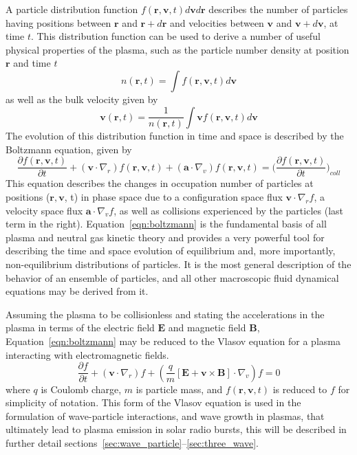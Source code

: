 A particle distribution function $f(\mathbf{r}, \mathbf{v}, t)d\mathbf{v}d\mathbf{r}$ describes the number of particles having positions between $\mathbf{r}$ and $\mathbf{r}+d\mathbf{r}$ and velocities between $\mathbf{v}$ and $\mathbf{v}+d\mathbf{v}$, at time $t$. This distribution function can be used to derive a number of useful physical properties of the plasma, such as the particle number density at position $\mathbf{r}$ and time $t$ 
\begin{equation}
n(\mathbf{r},t) = \int f(\mathbf{r}, \mathbf{v},t) d \mathbf{v}
\label{eqn:num_density}
\end{equation}
as well as the bulk velocity given by
\begin{equation}
 \mathbf{v}(\mathbf{r},t) = \frac{1}{n(\mathbf{r},t)}\int  \mathbf{v} f(\mathbf{r}, \mathbf{v},t) d \mathbf{v}
\label{eqn:bulk_flow}
\end{equation}
The evolution of this distribution function in time and space is described by the Boltzmann equation, given by
\begin{equation}
\frac{\partial f(\mathbf{r}, \mathbf{v},t)}{\partial t}  +     ( \mathbf{v}\cdot\nabla_r)f(\mathbf{r}, \mathbf{v},t)    + (\mathbf{a}\cdot\nabla_v)f(\mathbf{r}, \mathbf{v},t) = \bigg(\frac{\partial f(\mathbf{r}, \mathbf{v},t)}{\partial t}\bigg)_{coll}
\label{eqn:boltzmann}
\end{equation}
This equation describes the changes in occupation number of particles at positions ($\mathbf{r}, \mathbf{v}$, t) in phase space due to a configuration space flux $\mathbf{v}\cdot\nabla_rf$, a velocity space flux $ \mathbf{a}\cdot\nabla_vf$, as well as collisions experienced by the particles (last term in the right). Equation~\ref{eqn:boltzmann} is the fundamental basis of all plasma and neutral gas kinetic theory and provides a very powerful tool for describing the time and space evolution of equilibrium and, more importantly, non-equilibrium distributions of particles. It is the most general description of the behavior of an ensemble of particles, and all other macroscopic fluid dynamical equations may be derived from it.

Assuming  the plasma to be collisionless and stating the accelerations in the plasma in terms of the electric field $\mathbf{E}$ and magnetic field $\mathbf{B}$, Equation~\ref{eqn:boltzmann} may be reduced to the Vlasov equation for a plasma interacting with electromagnetic fields.
\begin{equation}
\frac{\partial f}{\partial t}  +(\mathbf{v}\cdot\nabla_r)f + (\frac{q}{m}[\mathbf{E} + \mathbf{v}\times \mathbf{B}]\cdot\nabla_v)f = 0
\end{equation}
where $q$ is Coulomb charge, $m$ is particle mass, and $f(\mathbf{r}, \mathbf{v},t)$ is reduced to $f$ for simplicity of notation. This form of the Vlasov equation is used in the formulation of wave-particle interactions, and wave growth in plasmas, that ultimately lead to plasma emission in solar radio bursts, this will be described in further detail sections~\ref{sec:wave_particle}--\ref{sec:three_wave}.

